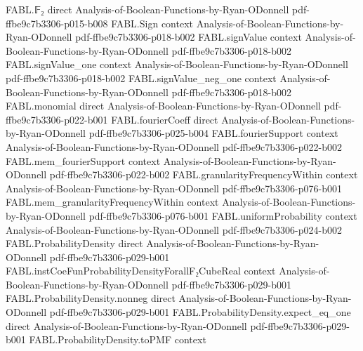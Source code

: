 \begin{theorem}
\label{FABL.densityExpectation_eq_convolution_apply_zero}
\leanok
{}
\proofstep
  {FABL.𝔽₂}
  {direct}
  {Analysis-of-Boolean-Functions-by-Ryan-ODonnell}
  {pdf-ffbe9c7b3306-p015-b008}
\proofstep
  {FABL.Sign}
  {context}
  {Analysis-of-Boolean-Functions-by-Ryan-ODonnell}
  {pdf-ffbe9c7b3306-p018-b002}
\proofstep
  {FABL.signValue}
  {context}
  {Analysis-of-Boolean-Functions-by-Ryan-ODonnell}
  {pdf-ffbe9c7b3306-p018-b002}
\proofstep
  {FABL.signValue_one}
  {context}
  {Analysis-of-Boolean-Functions-by-Ryan-ODonnell}
  {pdf-ffbe9c7b3306-p018-b002}
\proofstep
  {FABL.signValue_neg_one}
  {context}
  {Analysis-of-Boolean-Functions-by-Ryan-ODonnell}
  {pdf-ffbe9c7b3306-p018-b002}
\proofstep
  {FABL.monomial}
  {direct}
  {Analysis-of-Boolean-Functions-by-Ryan-ODonnell}
  {pdf-ffbe9c7b3306-p022-b001}
\proofstep
  {FABL.fourierCoeff}
  {direct}
  {Analysis-of-Boolean-Functions-by-Ryan-ODonnell}
  {pdf-ffbe9c7b3306-p025-b004}
\proofstep
  {FABL.fourierSupport}
  {context}
  {Analysis-of-Boolean-Functions-by-Ryan-ODonnell}
  {pdf-ffbe9c7b3306-p022-b002}
\proofstep
  {FABL.mem_fourierSupport}
  {context}
  {Analysis-of-Boolean-Functions-by-Ryan-ODonnell}
  {pdf-ffbe9c7b3306-p022-b002}
\proofstep
  {FABL.granularityFrequencyWithin}
  {context}
  {Analysis-of-Boolean-Functions-by-Ryan-ODonnell}
  {pdf-ffbe9c7b3306-p076-b001}
\proofstep
  {FABL.mem_granularityFrequencyWithin}
  {context}
  {Analysis-of-Boolean-Functions-by-Ryan-ODonnell}
  {pdf-ffbe9c7b3306-p076-b001}
\proofstep
  {FABL.uniformProbability}
  {context}
  {Analysis-of-Boolean-Functions-by-Ryan-ODonnell}
  {pdf-ffbe9c7b3306-p024-b002}
\proofstep
  {FABL.ProbabilityDensity}
  {direct}
  {Analysis-of-Boolean-Functions-by-Ryan-ODonnell}
  {pdf-ffbe9c7b3306-p029-b001}
\proofstep
  {FABL.instCoeFunProbabilityDensityForallF₂CubeReal}
  {context}
  {Analysis-of-Boolean-Functions-by-Ryan-ODonnell}
  {pdf-ffbe9c7b3306-p029-b001}
\proofstep
  {FABL.ProbabilityDensity.nonneg}
  {direct}
  {Analysis-of-Boolean-Functions-by-Ryan-ODonnell}
  {pdf-ffbe9c7b3306-p029-b001}
\proofstep
  {FABL.ProbabilityDensity.expect_eq_one}
  {direct}
  {Analysis-of-Boolean-Functions-by-Ryan-ODonnell}
  {pdf-ffbe9c7b3306-p029-b001}
\proofstep
  {FABL.ProbabilityDensity.toPMF}
  {context}

\end{theorem}
